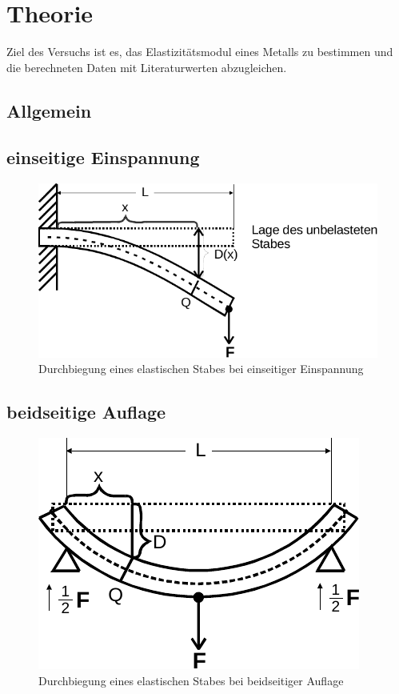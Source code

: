 \section{Theorie}
\label{sec:Theorie}

Ziel des Versuchs ist es, das Elastizitätsmodul eines Metalls zu bestimmen und die berechneten Daten mit Literaturwerten abzugleichen.


\subsection{Allgemein}



\subsection{einseitige Einspannung}

\begin{figure}
    \centering
    \includegraphics{content/einseitig.pdf}
    \caption{Durchbiegung eines elastischen Stabes bei einseitiger Einspannung}
    \label{fig:einseits}
  \end{figure}

\subsection{beidseitige Auflage}

\begin{figure}
  \centering
  \includegraphics{content/beidseits.pdf}
  \caption{Durchbiegung eines elastischen Stabes bei beidseitiger Auflage}
  \label{fig:beidseits}
\end{figure}


\cite{sample}
